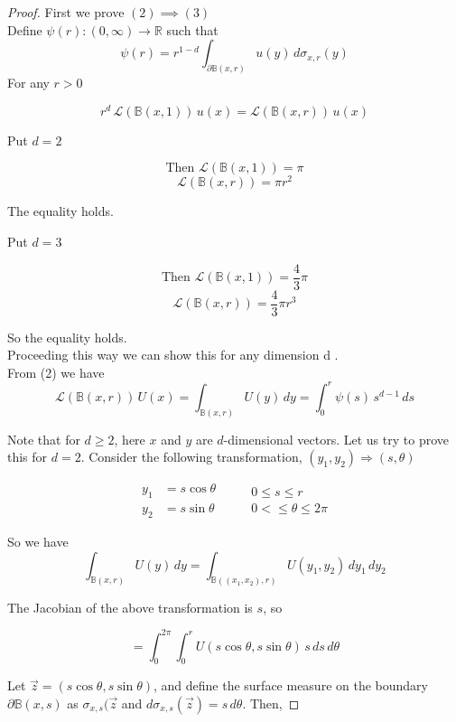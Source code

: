 \documentclass{article}
\numberwithin{equation}{section}
\begin{document}
\begin{proof}
First we prove \((2) \implies (3)\)\\
Define \(\psi(r) : (0,\infty) \to \mathbb{R}\) such that 
\[
\psi(r) = r^{1 - d} \int_{\partial \mathbb{B}(x, r)} u(y) \, d\sigma_{x, r}(y)
\]
For any \(r >0\)


\[
r^d \, \mathscr{L}(\mathbb{B}(x,1)) \, u(x) = \mathscr{L}(\mathbb{B}(x,r)) \, u(x)
\]

Put \( d = 2 \)

\[
\text{Then } \mathscr{L}(\mathbb{B}(x,1)) = \pi
\]
\[
\mathscr{L}(\mathbb{B}(x,r)) = \pi r^2
\]

The equality holds.

Put \( d = 3 \)

\[
\text{Then } \mathscr{L}(\mathbb{B}(x,1)) = \frac{4}{3} \pi
\]
\[
\mathscr{L}(\mathbb{B}(x,r)) = \frac{4}{3} \pi r^3
\]

So the equality holds.\\
Proceeding this way we can show this for any dimension d .\\

\noindent From (2) we have
\[
\mathscr{L}(\mathbb{B}(x,r))\,U(x) = \int_{\mathbb{B}(x,r)} U(y)\,dy = \int_0^r \psi(s)\,s^{d-1}\,ds
\]

\noindent Note that for \( d \geq 2 \), here \( x \) and \( y \) are \( d \)-dimensional vectors.  
Let us try to prove this for \( d = 2 \).  
Consider the following transformation, \( (y_1, y_2) \Rightarrow (s, \theta) \)

\[
\begin{aligned}
    y_1 &= s \cos \theta \\
    y_2 &= s \sin \theta
\end{aligned}
\quad \quad
\begin{aligned}
    0 \leq s \leq r \\
    0 <\leq \theta \leq 2\pi
\end{aligned}
\]

So we have
\[
\int_{\mathbb{B}(x,r)} U(y)\,dy = \int_{\mathbb{B}((x_1,x_2),r)} U(y_1,y_2)\,dy_1\,dy_2
\]

The Jacobian of the above transformation is \( s \), so

\[
= \int_0^{2\pi} \int_0^r U(s\cos\theta, s\sin\theta)\,s\,ds\,d\theta
\]

Let \( \vec{z} = (s\cos\theta, s\sin\theta) \), and define the surface measure on the boundary \( \partial \mathbb{B}(x,s) \) as \(\sigma_{x,s}(\vec{z}\) and \( d\sigma_{x,s}(\vec{z}) = s\,d\theta \). Then,


\end{proof}
\end{document}
